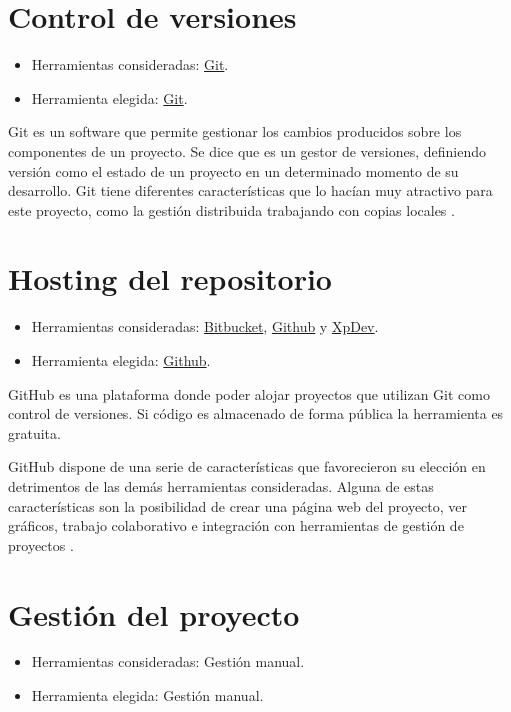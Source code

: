 \section{Control de versiones}

\begin{itemize}
\tightlist
\item
  Herramientas consideradas: \href{https://git-scm.com/}{Git}.
\item
  Herramienta elegida: \href{https://git-scm.com/}{Git}.
\end{itemize}

Git es un software que permite gestionar los cambios producidos sobre los componentes de un proyecto. Se dice que es un gestor de versiones, definiendo versión como el estado de un proyecto en un determinado momento de su desarrollo. Git tiene diferentes características que lo hacían muy atractivo para este proyecto, como la gestión distribuida trabajando con copias locales \cite{git:wiki}.

\section{Hosting del repositorio}

\begin{itemize}
\tightlist
\item
  Herramientas consideradas: \href{https://bitbucket.org/}{Bitbucket}, \href{https://github.com/}{Github} y \href{https://xp-dev.com/}{XpDev}.
\item
  Herramienta elegida: \href{https://github.com/}{Github}.
\end{itemize}

GitHub es una plataforma donde poder alojar proyectos que utilizan Git como control de versiones. Si código es almacenado de forma pública la herramienta es gratuita.

GitHub dispone de una serie de características que favorecieron su elección en detrimentos de las demás herramientas consideradas. Alguna de estas características son la posibilidad de crear una página web del proyecto, ver gráficos, trabajo colaborativo e integración con herramientas de gestión de proyectos \cite{github:wiki}.

\section{Gestión del proyecto}

\begin{itemize}
\tightlist
\item
  Herramientas consideradas: Gestión manual.
\item
  Herramienta elegida: Gestión manual.
\end{itemize}

